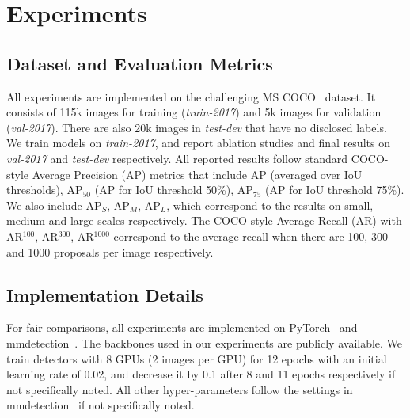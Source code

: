 \documentclass[10pt,twocolumn,letterpaper]{article}
\begin{document}
\section{Experiments}
\subsection{Dataset and Evaluation Metrics}
All experiments are implemented on the challenging MS COCO~\cite{coco} dataset.
It consists of 115k images for training (\emph{train-2017}) and 5k images for validation (\emph{val-2017}).
There are also 20k images in \emph{test-dev} that have no disclosed labels.
We train models on \emph{train-2017}, and report ablation studies and final results on \emph{val-2017} and \emph{test-dev} respectively.
All reported results follow standard COCO-style Average Precision (AP) metrics that include
AP (averaged over IoU thresholds), AP$_{50}$ (AP for IoU threshold 50\%), AP$_{75}$ (AP for IoU threshold 75\%).
We also include AP$_{S}$, AP$_M$, AP$_L$, which correspond to the results on small, medium and large scales respectively.
The COCO-style Average Recall (AR) with AR$^{100}$, AR$^{300}$, AR$^{1000}$ correspond to the average recall when there are 100, 300 and 1000 proposals per image respectively.

\subsection{Implementation Details}
For fair comparisons, all experiments are implemented on PyTorch~\cite{pytorch} and mmdetection~\cite{mmdetection2018}.
The backbones used in our experiments are publicly available.
We train detectors with 8 GPUs (2 images per GPU) for 12 epochs with an initial learning rate of 0.02, and decrease it by 0.1 after 8 and 11 epochs respectively if not specifically noted.
All other hyper-parameters follow the settings in mmdetection~\cite{mmdetection2018} if not specifically noted.
\end{document}
